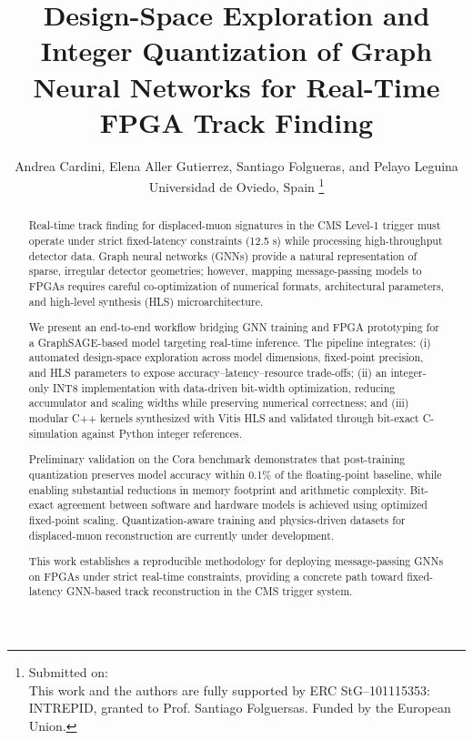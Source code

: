 \documentclass{IEEEtran}
\begin{document}
\title{Design-Space Exploration and Integer Quantization of Graph Neural Networks for Real-Time FPGA Track Finding}
\author{Andrea Cardini, Elena Aller Gutierrez, Santiago Folgueras, and Pelayo Leguina \newline Universidad de Oviedo, Spain
\thanks{Submitted on:
\\
This work and the authors are fully supported by ERC StG--101115353: INTREPID, granted to Prof. Santiago Folguersas. Funded by the European Union.
}}

\maketitle

\begin{abstract}
Real-time track finding for displaced-muon signatures in the CMS Level-1 trigger must operate under strict fixed-latency constraints (12.5 s) while processing high-throughput detector data. Graph neural networks (GNNs) provide a natural representation of sparse, irregular detector geometries; however, mapping message-passing models to FPGAs requires careful co-optimization of numerical formats, architectural parameters, and high-level synthesis (HLS) microarchitecture.

We present an end-to-end workflow bridging GNN training and FPGA prototyping for a GraphSAGE-based model targeting real-time inference. The pipeline integrates: (i) automated design-space exploration across model dimensions, fixed-point precision, and HLS parameters to expose accuracy--latency--resource trade-offs; (ii) an integer-only INT8 implementation with data-driven bit-width optimization, reducing accumulator and scaling widths while preserving numerical correctness; and (iii) modular C++ kernels synthesized with Vitis HLS and validated through bit-exact C-simulation against Python integer references.

Preliminary validation on the Cora benchmark demonstrates that post-training quantization preserves model accuracy within 0.1\% of the floating-point baseline, while enabling substantial reductions in memory footprint and arithmetic complexity. Bit-exact agreement between software and hardware models is achieved using optimized fixed-point scaling. Quantization-aware training and physics-driven datasets for displaced-muon reconstruction are currently under development.

This work establishes a reproducible methodology for deploying message-passing GNNs on FPGAs under strict real-time constraints, providing a concrete path toward fixed-latency GNN-based track reconstruction in the CMS trigger system.
\end{abstract}
\end{document}
